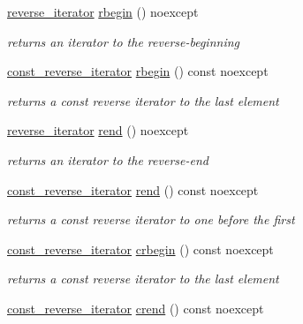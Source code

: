 \begin{DoxyCompactItemize}
\hyperlink{classnlohmann_1_1basic__json_a2f1f83aa187a56dc5ec7a7027065ac8a}{reverse\-\_\-iterator} \hyperlink{classnlohmann_1_1basic__json_a62ccf5b9b3674aec2403fbc02da03db8}{rbegin} () noexcept
\begin{DoxyCompactList}\small\item\em returns an iterator to the reverse-\/beginning \end{DoxyCompactList}\item 
\hyperlink{classnlohmann_1_1basic__json_ae336fff01f4b78e3e16e5008dc8dbc00}{const\-\_\-reverse\-\_\-iterator} \hyperlink{classnlohmann_1_1basic__json_a15e70a44e2a8db929694819fed256653}{rbegin} () const noexcept
\begin{DoxyCompactList}\small\item\em returns a const reverse iterator to the last element \end{DoxyCompactList}\item 
\hyperlink{classnlohmann_1_1basic__json_a2f1f83aa187a56dc5ec7a7027065ac8a}{reverse\-\_\-iterator} \hyperlink{classnlohmann_1_1basic__json_aaa160a960dd3dd90856a72b1d8dbe707}{rend} () noexcept
\begin{DoxyCompactList}\small\item\em returns an iterator to the reverse-\/end \end{DoxyCompactList}\item 
\hyperlink{classnlohmann_1_1basic__json_ae336fff01f4b78e3e16e5008dc8dbc00}{const\-\_\-reverse\-\_\-iterator} \hyperlink{classnlohmann_1_1basic__json_a36fda9749be288cac96cfd846cb62561}{rend} () const noexcept
\begin{DoxyCompactList}\small\item\em returns a const reverse iterator to one before the first \end{DoxyCompactList}\item 
\hyperlink{classnlohmann_1_1basic__json_ae336fff01f4b78e3e16e5008dc8dbc00}{const\-\_\-reverse\-\_\-iterator} \hyperlink{classnlohmann_1_1basic__json_a060b33f8f255986088652625f9d50681}{crbegin} () const noexcept
\begin{DoxyCompactList}\small\item\em returns a const reverse iterator to the last element \end{DoxyCompactList}\item 
\hyperlink{classnlohmann_1_1basic__json_ae336fff01f4b78e3e16e5008dc8dbc00}{const\-\_\-reverse\-\_\-iterator} \hyperlink{classnlohmann_1_1basic__json_aa7084e62b93ef0236698b246a58bb2da}{crend} () const noexcept

\end{DoxyCompactItemize}
